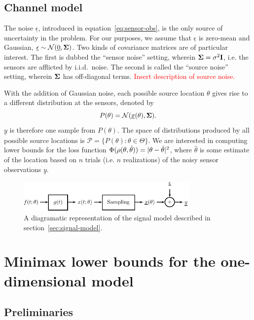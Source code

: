 \documentclass[conference]{IEEEtran}
\providecommand{\v}{}
\renewcommand{\v}[1]{\underline{#1}}
\providecommand{\m}{}
\renewcommand{\m}[1]{{\bf #1}}
\DeclarePairedDelimiter\abs{\lvert}{\rvert}
\begin{document}
\subsection{Channel model}
\label{sec:channel-model}

The noise $\v \epsilon$, introduced in equation~\eqref{eq:sensor-obs}, is
the only source of uncertainty in the problem. For our purposes, we assume that
$\v \epsilon$ is zero-mean and Gaussian, $\v \epsilon \sim \mathcal{N}(\v 0, \m
\Sigma)$. Two kinds of covariance matrices are of particular interest. The
first is dubbed the ``sensor noise'' setting, wherein $\m\Sigma = \sigma^2 \m
I$, i.e. the sensors are afflicted by i.i.d.\ noise. The second is called the
``source noise'' setting, wherein $\m\Sigma$ has off-diagonal terms.
\textcolor{red}{Insert description of source noise.}

With the addition of Gaussian noise, each possible source location $\theta$
gives rise to a different distribution at the sensors, denoted by
\begin{equation} \label{eq:p-theta}
	P(\theta) = \mathcal{N}(\v x(\theta), \m \Sigma).
\end{equation}
$\v y$ is therefore one sample from $P(\theta)$. The space of distributions
produced by all possible source locations is $\mathcal{P} = \{P(\theta) :
\theta \in \Theta \}$. We are interested in computing lower bounds for the loss
function $\Phi(\rho(\theta, \hat\theta)) = \abs{\theta - \hat\theta}^2$, where
$\hat\theta$ is some estimate of the location based on $n$ trials (i.e. $n$
realizations) of the noisy sensor observations $\v y$.

\begin{figure}[tp] %
	\centering
	\includegraphics[width=3.5in]{block-diagram}
	\caption{A diagramatic representation of the signal model described in
	section~\ref{sec:signal-model}.}
	\label{fig:signal-model}
\end{figure}

\section{Minimax lower bounds for the one-dimensional model}
\label{sec:minimax-lower-bounds}

\subsection{Preliminaries}
\end{document}

